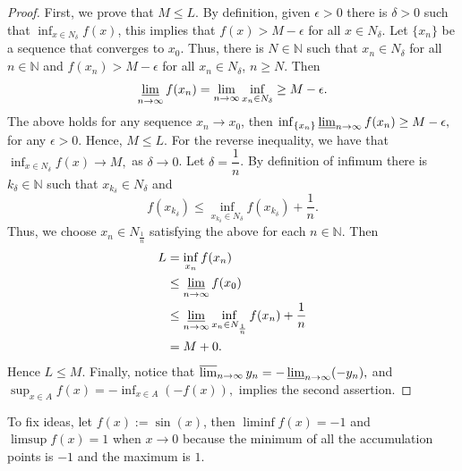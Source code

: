 \begin{proof}
        First, we prove that $M \leq L$. By definition, given $\epsilon>0$ there
        is $\delta >0$ such that $\inf_{x \in N_{\delta}} f(x)$, this implies that
        $f(x) > M - \epsilon$ for all $x \in N_{\delta}$. Let $\{x_n\}$ be a sequence
        that converges to $x_0$. Thus, there is $N \in \mathbb{N}$ such that 
        $x_n \in N_{\delta}$ for all $n \in \mathbb{N}$ and
        $f(x_n) > M - \epsilon$ for all $x_n \in N_{\delta}$, $n \geq N$.
        Then
        $$
            \varliminf_{n \to \infty} f(x_n) = \lim_{n \to \infty} \inf_{x_n \in N_{\delta}} %
            \geq M - \epsilon.
        $$
        The above holds for any sequence $x_n \to x_0$, then
        $
            \inf_{\{x_n\}} \varliminf_{n \to \infty} f(x_n) \geq M - \epsilon,
        $
        for any $\epsilon > 0$. Hence, $M \leq L$.
        For the reverse inequality, we have that 
        $
            \inf_{x \in N_{\delta}} f(x) \to M,
        $
        as $\delta \to 0$. Let $\delta = \dfrac{1}{n}$. By definition of infimum
        there is $k_{\delta} \in \mathbb{N}$ such that $x_{k_{\delta}} \in N_{\delta}$ and
        \begin{equation*}
            f(x_{k_\delta}) \leq \inf_{ x_{k_\delta} \in N_{\delta}} %
                f(x_{k_\delta}) + \dfrac{1}{n}.
        \end{equation*}
        Thus, we choose $x_n \in N_{\frac{1}{n}}$ satisfying the above for each
        $n \in  \mathbb{N}$. Then
        \begin{align*}
            L   &=      \inf_{x_n} f(x_n )  \\
                &\leq   \varliminf_{n \to \infty} f(x_0) \\
                &\leq   \varliminf_{n \to \infty} %
                            \inf_{x_n \in N_{\frac{1}{n}}} f(x_n) + \dfrac{1}{n}\\
                &= M + 0.
        \end{align*}
        Hence $L \leq M$. Finally, notice that
        $
            \varlimsup_{n \to \infty} y_n = - \varliminf_{n \to \infty}(- y_n),
        $
        and
        $
            \sup_{x \in A} f(x) = - \inf_{x \in A}(- f(x)),
        $
        implies the second assertion.
    \end{proof}
    To fix ideas, let $f(x):= \sin(x)$, then $\liminf f(x) = -1$ and 
    $\limsup f(x)= 1$ when $x \to 0$ because the minimum of all the accumulation
    points is $-1$  and the maximum is $1$. 
